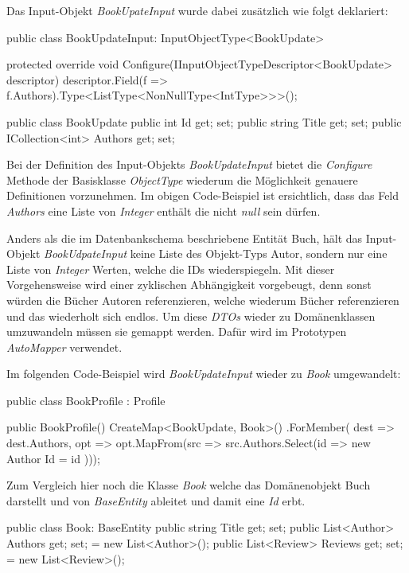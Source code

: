Das Input-Objekt \textit{BookUpateInput} wurde dabei zusätzlich wie folgt deklariert:
\begin{JsCode}
public class BookUpdateInput: InputObjectType<BookUpdate> {

    protected override void Configure(IInputObjectTypeDescriptor<BookUpdate> descriptor) {
        descriptor.Field(f => f.Authors).Type<ListType<NonNullType<IntType>>>();
    }
}

public class BookUpdate {
    public int Id { get; set; }
    public string Title { get; set; }
    public ICollection<int> Authors { get; set; }
}
\end{JsCode}

Bei der Definition des Input-Objekts \textit{BookUpdateInput} bietet die \textit{Configure} Methode der Basisklasse \textit{ObjectType} wiederum die Möglichkeit genauere Definitionen vorzunehmen.
Im obigen Code-Beispiel ist ersichtlich, dass das Feld \textit{Authors} eine Liste von \textit{Integer} enthält die nicht \textit{null} sein dürfen.
\newline

Anders als die im Datenbankschema beschriebene Entität Buch, hält das Input-Objekt \textit{BookUdpateInput} keine Liste des Objekt-Typs Autor, sondern nur eine Liste von \textit{Integer} Werten, welche die IDs wiederspiegeln.
Mit dieser Vorgehensweise wird einer zyklischen Abhängigkeit vorgebeugt, denn sonst würden die Bücher Autoren referenzieren, welche wiederum Bücher referenzieren und das wiederholt sich endlos.
Um diese \textit{DTOs} wieder zu Domänenklassen umzuwandeln müssen sie gemappt werden.
Dafür wird im Prototypen \textit{AutoMapper} verwendet.

Im folgenden Code-Beispiel wird \textit{BookUpdateInput} wieder zu \textit{Book} umgewandelt:
\begin{JsCode}
public class BookProfile : Profile {
    public BookProfile() {
        CreateMap<BookUpdate, Book>()
            .ForMember(
            dest => dest.Authors,
            opt => opt.MapFrom(src => src.Authors.Select(id => new Author { Id = id })));
    }

}
\end{JsCode}

Zum Vergleich hier noch die Klasse \textit{Book} welche das Domänenobjekt Buch darstellt und von \textit{BaseEntity} ableitet und damit eine \textit{Id} erbt.

\begin{JsCode}
public class Book: BaseEntity {
    public string Title { get; set; }
    public List<Author> Authors { get; set; } = new List<Author>();
    public List<Review> Reviews { get; set; } = new List<Review>();
}
\end{JsCode}

